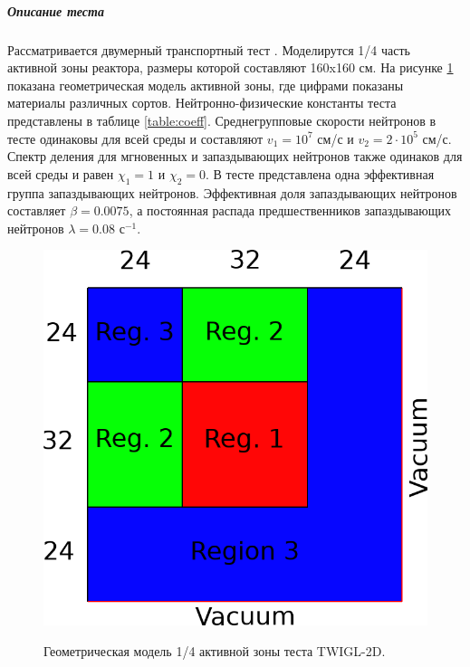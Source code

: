 \documentclass{crm-article}
\begin{document}

\subparagraph{Описание теста}
Рассматривается двумерный транспортный тест \cite{twigl}. 
Моделирутся 1/4 часть активной зоны реактора, размеры которой составляют 160x160 см.
На рисунке \ref{ris:twigl} показана геометрическая модель активной зоны, где цифрами показаны материалы различных сортов.  
Нейтронно-физические константы теста представлены в таблице \ref{table:coeff}. 
Среднегрупповые скорости нейтронов в тесте одинаковы для всей среды и составляют $v_1 = 10^7$ см/с и $v_2 = 2 \cdot 10^5$ см/с. 
Спектр деления для мгновенных и запаздывающих нейтронов также одинаков для всей среды и равен $\chi_1 = 1$ и $\chi_2 = 0$.
В тесте представлена одна эффективная группа запаздывающих нейтронов. 
Эффективная доля запаздывающих нейтронов составляет $\beta = 0.0075$, а постоянная распада предшественников запаздывающих нейтронов $\lambda = 0.08$ с$^{-1}$.  

\begin{figure}[ht]
\begin{center}
	\includegraphics[width=0.5\linewidth]{twigl.png}\\
	\caption{\label{image:canonsummary}Геометрическая модель 1/4 активной зоны теста TWIGL-2D.}
	\label{ris:twigl}
\end{center}
\end{figure}
\end{document}
